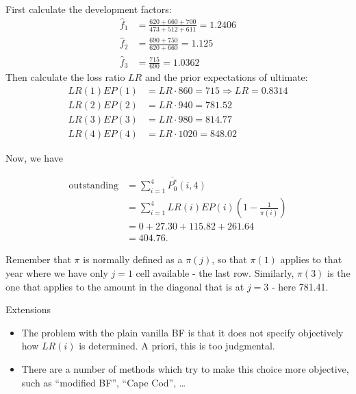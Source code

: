 \documentclass[
  ignorenonframetext,
  t,handout]{beamer}
\providecommand{\tightlist}{%
  \setlength{\itemsep}{0pt}\setlength{\parskip}{0pt}}
\begin{document}
\begin{frame}
First calculate the development factors: \[\begin{aligned}
\widehat{f}_1 &= \frac{620+660+700}{473+512+611} = 1.2406 \\
\widehat{f}_2 &= \frac{690+750}{620+660} = 1.125 \\
\widehat{f}_3 &= \frac{715}{690} = 1.0362
\end{aligned}\] Then calculate the loss ratio \(LR\) and the prior
expectations of ultimate: \[\begin{aligned}
LR(1)EP(1) &=  LR \cdot 860 = 715 \Longrightarrow LR = 0.8314 \\
LR(2)EP(2)  &= LR \cdot 940 = 781.52\\
LR(3)EP(3)  &= LR \cdot 980 = 814.77\\
LR(4)EP(4)  &= LR \cdot 1020 = 848.02
\end{aligned}\]
\end{frame}

\begin{frame}
Now, we have

\[\begin{aligned}
\text{outstanding} &= \sum_{i=1}^4 \overline{P_0^*}(i,4) \\
&= \sum_{i=1}^4 LR(i)EP(i)\left(1-\frac{1}{\pi(i)}\right) \\
&= 0+27.30+115.82+261.64 \\
&=404.76.
\end{aligned}\]

Remember that \(\pi\) is normally defined as a \(\pi(j)\), so that
\(\pi(1)\) applies to that year where we have only \(j=1\) cell
available - the last row. Similarly, \(\pi(3)\) is the one that applies
to the amount in the diagonal that is at \(j=3\) - here 781.41.
\end{frame}

\begin{frame}{Extensions}
\label{extensions}
\begin{itemize}
\tightlist
\item
  The problem with the plain vanilla BF is that it does not specify
  objectively how \(LR(i)\) is determined. A priori, this is too
  judgmental.
\item
  There are a number of methods which try to make this choice more
  objective, such as ``modified BF'', ``Cape Cod'', \ldots{}
\end{itemize}
\end{frame}
\end{document}

